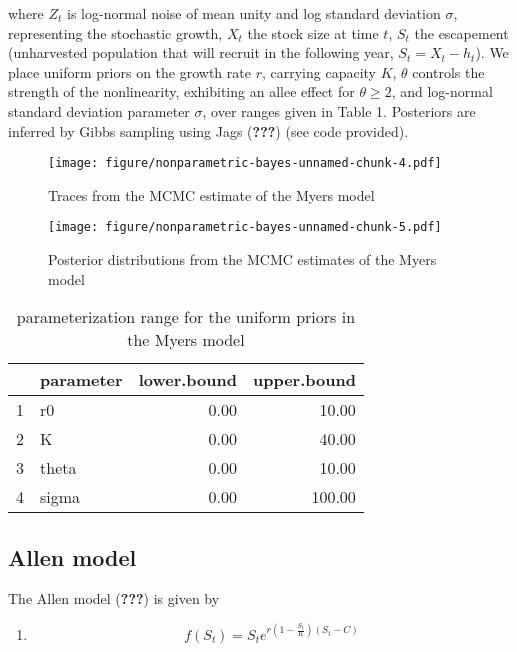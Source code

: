 \documentclass[author-year, review]{elsarticle} %
\makeatletter
\def\maxwidth{\ifdim\Gin@nat@width>\linewidth\linewidth
\else\Gin@nat@width\fi}
\let\Oldincludegraphics\includegraphics
\renewcommand{\includegraphics}[1]{\Oldincludegraphics[width=\maxwidth]{#1}}
\makeatother
\begin{document}
where $Z_t$ is log-normal noise of mean unity and log standard deviation
$\sigma$, representing the stochastic growth, $X_t$ the stock size at
time $t$, $S_t$ the escapement (unharvested population that will recruit
in the following year, $S_t = X_t - h_t$). We place uniform priors on
the growth rate $r$, carrying capacity $K$, $\theta$ controls the
strength of the nonlinearity, exhibiting an allee effect for
$\theta \geq 2$, and log-normal standard deviation parameter $\sigma$,
over ranges given in Table 1. Posteriors are inferred by Gibbs sampling
using Jags ({\textbf{???}}) (see code provided).

\begin{figure}[htbp]
\centering
\texttt{[image: figure/nonparametric-bayes-unnamed-chunk-4.pdf]}
\caption{Traces from the MCMC estimate of the Myers model}
\end{figure}

\begin{figure}[htbp]
\centering
\texttt{[image: figure/nonparametric-bayes-unnamed-chunk-5.pdf]}
\caption{Posterior distributions from the MCMC estimates of the Myers
model}
\end{figure}

\begin{table}[ht]
\begin{center}
\begin{tabular}{rlrr}
  \hline
 & parameter & lower.bound & upper.bound \\ 
  \hline
1 & r0 & 0.00 & 10.00 \\ 
  2 & K & 0.00 & 40.00 \\ 
  3 & theta & 0.00 & 10.00 \\ 
  4 & sigma & 0.00 & 100.00 \\ 
   \hline
\end{tabular}
\caption{parameterization range for the uniform priors in the Myers model}
\end{center}
\end{table}

\subsection{Allen model}\label{allen-model}

The Allen model ({\textbf{???}}) is given by

\begin{enumerate}
\def\labelenumi{(\arabic{enumi})}
\setcounter{enumi}{2}
\itemsep1pt\parskip0pt
\item
  \[f(S_t) = S_t e^{r \left(1 - \frac{S_t}{K}\right)\left(S_t - C\right)} \]
\end{enumerate}
\end{document}
